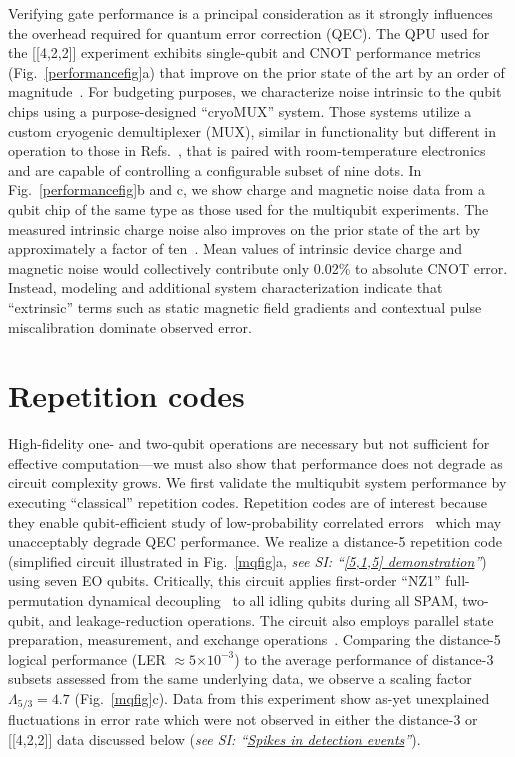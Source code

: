 \documentclass[aps,prl,twocolumn,superscriptaddress,nobibnotes,10pt,floatfix]{revtex4-2}
\newcommand{\onlinecite}[1]{\cite{#1}}
\newcommand{\figsubref}[2]{Fig.~\ref{#1}{#2}}
\newcommand{\SIlink}[2]{\textit{see SI: ``\hyperref[#2]{#1}''}}
\newcommand{\e}[1]{\ensuremath{\times 10^{#1}}}
\begin{document}
	Verifying gate performance is a principal consideration as it strongly influences the overhead required for quantum error correction (QEC).
	The QPU used for the [[4,2,2]] experiment exhibits single-qubit and CNOT performance metrics (\figsubref{performancefig}{a}) that improve on the prior state of the art by an order of magnitude~\cite{ha_two-dimensional_2025,madzik_operating_2025,weinstein_universal_2023}.
	For budgeting purposes, we characterize noise intrinsic to the qubit chips using a purpose-designed ``cryoMUX'' system.
	Those systems utilize a custom cryogenic demultiplexer (MUX), similar in functionality but different in operation to those in Refs.~\onlinecite{puddy_multiplexed_2015,paquelet_wuetz_multiplexed_2020,pauka_characterizing_2020,eastoe_method_2025,schmidt_135_2025,thomas_rapid_2025}, that is paired with room-temperature electronics and are capable of controlling a configurable subset of nine dots.
	In \figsubref{performancefig}{b} and c, we show charge and magnetic noise data from a qubit chip of the same type as those used for the multiqubit experiments.
	The measured intrinsic charge noise also improves on the prior state of the art by approximately a factor of ten~\cite{ha_two-dimensional_2025,
		madzik_operating_2025}.
	Mean values of intrinsic device charge and magnetic noise would collectively contribute only 0.02\% to absolute CNOT error.
	Instead, modeling and additional system characterization indicate that ``extrinsic'' terms such as static magnetic field gradients and contextual pulse miscalibration dominate observed error.


	\section{Repetition codes}\label{repetition-codes}

	High-fidelity one- and two-qubit operations are necessary but not sufficient for effective computation---we must also show that performance does not degrade as circuit complexity grows.
	We first validate the multiqubit system performance by executing ``classical'' repetition codes.
	Repetition codes are of interest because they enable qubit-efficient study of low-probability correlated errors~\cite{google_exponential_2021} which may unacceptably degrade QEC performance.
	We realize a distance-5 repetition code (simplified circuit illustrated in \figsubref{mqfig}{a}, \SIlink{[5,1,5] demonstration}{demonstration-515}) using seven EO qubits.
	Critically, this circuit applies first-order ``NZ1'' full-permutation dynamical decoupling~\cite{sun_full-permutation_2024} to all idling qubits during all SPAM, two-qubit, and leakage-reduction operations.
	The circuit also employs parallel state preparation, measurement, and exchange operations~\cite{madzik_operating_2025}. Comparing the distance-5 logical performance (LER $\approx 5\e{-3}$) to the average performance of distance-3 subsets assessed from the same underlying data, we observe a scaling factor $\Lambda_{5/3} = 4.7$ (\figsubref{mqfig}{c}).
	Data from this experiment show as-yet unexplained fluctuations in error rate which were not observed in either the distance-3 or [[4,2,2]] data discussed below (\SIlink{Spikes in detection events}{spikes-in-detection-events}).
\end{document}
